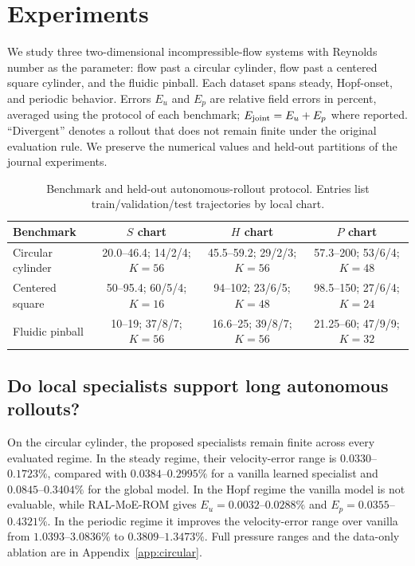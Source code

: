 \section{Experiments}
\label{sec:experiments}

We study three two-dimensional incompressible-flow systems with Reynolds number as the parameter: flow past a circular cylinder, flow past a centered square cylinder, and the fluidic pinball. Each dataset spans steady, Hopf-onset, and periodic behavior. Errors $E_u$ and $E_p$ are relative field errors in percent, averaged using the protocol of each benchmark; $E_{\rm joint}=E_u+E_p$ where reported. ``Divergent'' denotes a rollout that does not remain finite under the original evaluation rule. We preserve the numerical values and held-out partitions of the journal experiments.

\begin{table}[t]
\centering
\caption{Benchmark and held-out autonomous-rollout protocol. Entries list train/validation/test trajectories by local chart.}
\label{tab:benchmark_summary}
\small
\setlength{\tabcolsep}{3.2pt}
\begin{tabular}{lccc}
\toprule
Benchmark & $S$ chart & $H$ chart & $P$ chart \\
\midrule
Circular cylinder
 & 20.0--46.4; 14/2/4; $K{=}56$
 & 45.5--59.2; 29/2/3; $K{=}56$
 & 57.3--200; 53/6/4; $K{=}48$ \\
Centered square
 & 50--95.4; 60/5/4; $K{=}16$
 & 94--102; 23/6/5; $K{=}48$
 & 98.5--150; 27/6/4; $K{=}24$ \\
Fluidic pinball
 & 10--19; 37/8/7; $K{=}56$
 & 16.6--25; 39/8/7; $K{=}56$
 & 21.25--60; 47/9/9; $K{=}32$ \\
\bottomrule
\end{tabular}
\end{table}

\subsection{Do local specialists support long autonomous rollouts?}

On the circular cylinder, the proposed specialists remain finite across every evaluated regime. In the steady regime, their velocity-error range is $0.0330$--$0.1723\%$, compared with $0.0384$--$0.2995\%$ for a vanilla learned specialist and $0.0845$--$0.3404\%$ for the global model. In the Hopf regime the vanilla model is not evaluable, while RAL-MoE-ROM gives $E_u=0.0032$--$0.0288\%$ and $E_p=0.0355$--$0.4321\%$. In the periodic regime it improves the velocity-error range over vanilla from $1.0393$--$3.0836\%$ to $0.3809$--$1.3473\%$. Full pressure ranges and the data-only ablation are in Appendix~\ref{app:circular}.

